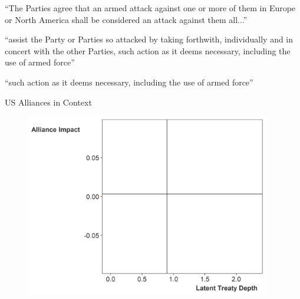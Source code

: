 \documentclass[12pt]{beamer}
\begin{document}

\begin{frame}[standout]

\large ``The Parties agree that an armed attack against one or more of them in Europe or North America shall be considered an attack against them all...'' 

 \end{frame}


\begin{frame}[standout]

\large ``assist the Party or Parties so attacked by taking forthwith, individually and in concert with the other Parties, such action as it deems necessary, including the use of armed force'' 

 \end{frame}


\begin{frame}[standout]

\huge ``such action as it deems necessary, including the use of armed force'' 

 \end{frame}


\begin{frame}{US Alliances in Context} 

\begin{figure}
	\centering
		\includegraphics[width=0.95\textwidth]{lambda-depth-us-blank.png}
\end{figure}


 \end{frame}
 
\end{document}

